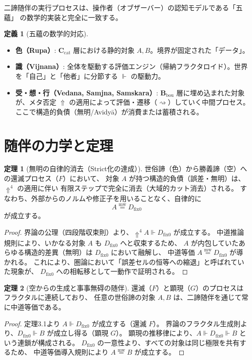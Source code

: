 \documentclass[11pt,a4paper]{article}
\theoremstyle{definition}
\newtheorem{definition}{定義}[section]
\newtheorem{theorem}{定理}[section]
\newcommand{\dfix}{D_{\mathrm{fix}0}} %
\newcommand{\mweq}{\mathrel{\overset{\mathrm{mw}}{=}}}
\newcommand{\metanegation}{\Uparrow}
\newcommand{\aletheiai}{\Vdash} %
\newcommand{\Cat}{\mathbf{C}_{\mathrm{cat}}}  %
\newcommand{\Bou}{\mathbf{B}_{\mathrm{bou}}}  %
\newcommand{\Leadsto}{\rightsquigarrow}
\begin{document}
二諦随伴の実行プロセスは、操作者（オブザーバー）の認知モデルである「五蘊」
の数学的実装と完全に一致する。

\begin{definition}[五蘊の数学的対応]
\begin{itemize}
    \item \textbf{色（Rupa）}: $\Cat$ 層における静的対象 $A, B$。境界が固定された「データ」。
    \item \textbf{識（Vijnana）}: 全体を駆動する評価エンジン（帰納フラクタロイド）。世界を「自己」と「他者」に分節する $\aletheiai$ の駆動力。
    \item \textbf{受・想・行（Vedana, Samjna, Samskara）}: $\Bou$ 層に埋め込まれた対象が、メタ否定 $\metanegation$ の適用によって評価・遷移（$\Leadsto$）していく中間プロセス。ここで構造的負債（無明/Avidyā）が消費または蓄積される。
\end{itemize}
\end{definition}

\section{随伴の力学と定理}

\begin{theorem}[無明の自律的消去（Strict化の達成）]
世俗諦（色）から勝義諦（空）への還滅プロセス（$F$）において、
対象 $A$ が持つ構造的負債（誤差・無明）は、$\metanegation^4$ の適用に伴い
有限ステップで完全に消去（大域的カット消去）される。
すなわち、外部からのノルムや修正子を用いることなく、自律的に
$$A \mweq \dfix$$
が成立する。
\end{theorem}
\begin{proof}
界論の公理（四段階収束則）より、$\metanegation^4 A \aletheiai \dfix$ が成立する。
中道推論規則により、いかなる対象 $A$ も $\dfix$ へと収束するため、
$A$ が内包していたあらゆる構造的差異（無明）は $\dfix$ において融解し、
中道等価 $A \mweq \dfix$ が導かれる。
これにより、圏論において「誤差セルの恒等への縮退」と呼ばれていた現象が、
$\dfix$ への相転移として一動作で証明される。
\end{proof}

\begin{theorem}[空からの生成と事事無碍の随伴]
還滅（$F$）と顕現（$G$）のプロセスはフラクタルに連続しており、
任意の世俗諦の対象 $A, B$ は、二諦随伴を通じて常に中道等価である。
\end{theorem}
\begin{proof}
定理3.1より $A \aletheiai \dfix$ が成立する（還滅 $F$）。
界論のフラクタル生成則より、$\dfix \aletheiai B$ が成立し得る（顕現 $G$）。
顕現の推移律により、$A \aletheiai \dfix \aletheiai B$ という連鎖が構成される。
$\dfix$ の一意性より、すべての対象は同じ極限を共有するため、
中道等価導入規則により $A \mweq B$ が成立する。
\end{proof}
\end{document}
